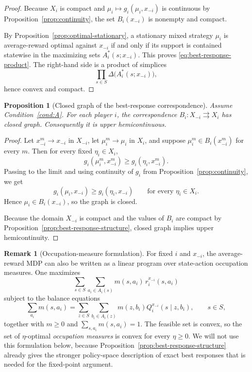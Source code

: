 \documentclass[11pt]{article}
\newtheorem{proposition}[theorem]{Proposition}
\theoremstyle{definition}
\newtheorem{remark}[theorem]{Remark}
\newcommand{\1}{\mathbf{1}}
\begin{document}
\begin{proof}
Because $X_i$ is compact and $\mu_i\mapsto g_i(\mu_i,x_{-i})$ is continuous by Proposition~\ref{prop:continuity}, the set $B_i(x_{-i})$ is nonempty and compact.

By Proposition~\ref{prop:optimal-stationary}, a stationary mixed strategy $\mu_i$ is average-reward optimal against $x_{-i}$ if and only if its support is contained statewise in the maximizing sets $A_i^*(s;x_{-i})$. This proves \eqref{eq:best-response-product}. The right-hand side is a product of simplices
\[
\prod_{s\in S}\Delta\bigl(A_i^*(s;x_{-i})\bigr),
\]
hence convex and compact.
\end{proof}

\begin{proposition}[Closed graph of the best-response correspondence]\label{prop:best-response-closed-graph}
Assume Condition~\ref{cond:A}. For each player $i$, the correspondence $B_i:X_{-i}\rightrightarrows X_i$ has closed graph. Consequently it is upper hemicontinuous.
\end{proposition}

\begin{proof}
Let $x_{-i}^m\to x_{-i}$ in $X_{-i}$, let $\mu_i^m\to \mu_i$ in $X_i$, and suppose $\mu_i^m\in B_i(x_{-i}^m)$ for every $m$. Then for every fixed $\eta_i\in X_i$,
\[
g_i(\mu_i^m,x_{-i}^m)\ge g_i(\eta_i,x_{-i}^m).
\]
Passing to the limit and using continuity of $g_i$ from Proposition~\ref{prop:continuity}, we get
\[
g_i(\mu_i,x_{-i})\ge g_i(\eta_i,x_{-i})\qquad\text{for every }\eta_i\in X_i.
\]
Hence $\mu_i\in B_i(x_{-i})$, so the graph is closed.

Because the domain $X_{-i}$ is compact and the values of $B_i$ are compact by Proposition~\ref{prop:best-response-structure}, closed graph implies upper hemicontinuity.
\end{proof}

\begin{remark}[Occupation-measure formulation]\label{rem:occupation}
For fixed $i$ and $x_{-i}$, the average-reward MDP can also be written as a linear program over state-action occupation measures. One maximizes
\[
\sum_{s\in S}\sum_{a_i\in A_i(s)}m(s,a_i)\,r_i^{x_{-i}}(s,a_i)
\]
subject to the balance equations
\[
\sum_{a_i}m(s,a_i)=\sum_{z\in S}\sum_{b_i\in A_i(z)}m(z,b_i)Q_i^{x_{-i}}(s\mid z,b_i),
\qquad s\in S,
\]
together with $m\ge0$ and $\sum_{s,a_i}m(s,a_i)=1$. The feasible set is convex, so the set of $\eta$-optimal \emph{occupation measures} is convex for every $\eta\ge0$. We will not use this formulation below, because Proposition~\ref{prop:best-response-structure} already gives the stronger policy-space description of exact best responses that is needed for the fixed-point argument.
\end{remark}
\end{document}
